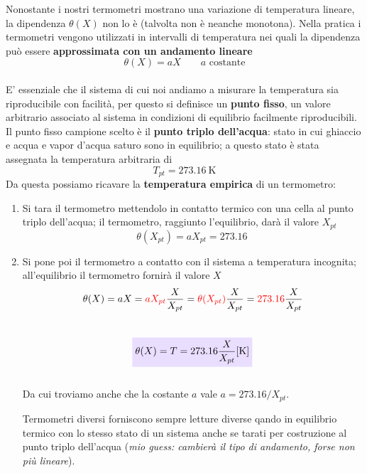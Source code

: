 \documentclass[x11names]{report}
\newcommand{\viola}[1]{\colorbox{yred}{$\displaystyle #1$}}
\begin{document}
	
	Nonostante i nostri termometri mostrano una variazione di temperatura lineare, la dipendenza \(\theta(X)\) non lo è (talvolta non è neanche monotona). Nella pratica i termometri vengono utilizzati in intervalli di temperatura nei quali la dipendenza può essere \textbf{approssimata con un andamento lineare} \\
	\[\theta(X) = aX \qquad a \text{ costante}\]\\
	E' essenziale che il sistema di cui noi andiamo a misurare la temperatura sia riproducibile con facilità, per questo si definisce un \textbf{punto fisso}, un valore arbitrario associato al sistema in condizioni di equilibrio facilmente riproducibili. Il punto fisso campione scelto è il \textbf{punto triplo dell'acqua}: stato in cui ghiaccio e acqua e vapor d'acqua saturo sono in equilibrio; a questo stato è stata assegnata la temperatura arbitraria di 
	\[ 
	T_{pt} = \SI{273.16}{\kelvin}
	\]
	Da questa possiamo ricavare la \textbf{temperatura empirica} di un termometro:
	\begin{enumerate}
		\item Si tara il termometro mettendolo in contatto termico con una cella al punto triplo dell'acqua; il termometro, raggiunto l'equilibrio, darà il valore \(X_{pt}\)
		\[ 
		\theta(X_{pt}) = aX_{pt} =  \SI{273.16}{}
		\]
		\item Si pone poi il termometro a contatto con il sistema a temperatura incognita; all'equilibrio il termometro fornirà il valore \(X\)
		\[ 
		\theta(X) = aX = \textcolor{red}{aX_{pt}}\frac{X}{X_{pt}} = \textcolor{red}{\theta(X_{pt})}\frac{X}{X_{pt}} = \textcolor{red}{273.16}\frac{X}{X_{pt}} 
		\]\\
		\begin{equation}\label{temperatura punto triplo}
			\viola{\theta(X) = T  = 273.16\frac{X}{X_{pt}} \SI{ }{[\kelvin]} }
		\end{equation}
		\\
		
		\noindent
		Da cui troviamo anche che la costante \(a\) vale \(a = 273.16/X_{pt}\).
		
		Termometri diversi forniscono sempre letture diverse qando in equilibrio termico con lo stesso stato di un sistema anche se tarati per costruzione al punto triplo dell'acqua (\textit{mio guess: cambierà il tipo di andamento, forse non più lineare}).
	\end{enumerate}
\end{document}
